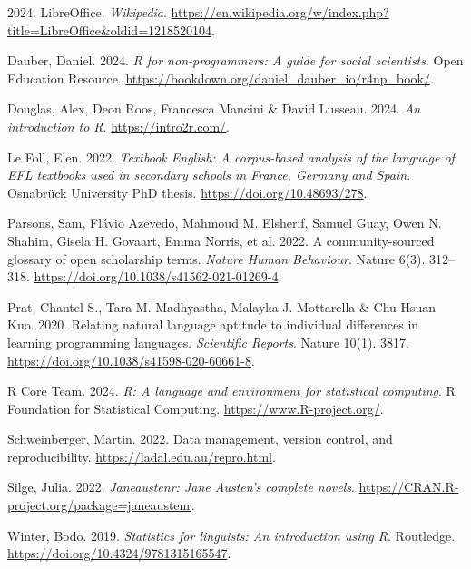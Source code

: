 \documentclass[
  letterpaper,
  DIV=11,
  numbers=noendperiod]{scrreprt}
\newlength{\cslhangindent}
\newenvironment{CSLReferences}[2] %
 {\begin{list}{}{%
  \setlength{\itemindent}{0pt}
  \setlength{\leftmargin}{0pt}
  \setlength{\parsep}{0pt}
  \ifodd #1
   \setlength{\leftmargin}{\cslhangindent}
   \setlength{\itemindent}{-1\cslhangindent}
  \fi
  \setlength{\itemsep}{#2\baselineskip}}}
 {\end{list}}
\begin{document}
\label{refs}
\begin{CSLReferences}{1}{0}
2024. LibreOffice. \emph{Wikipedia}.
\url{https://en.wikipedia.org/w/index.php?title=LibreOffice&oldid=1218520104}.

Dauber, Daniel. 2024. \emph{R for non-programmers: A guide for social
scientists}. Open Education Resource.
\url{https://bookdown.org/daniel_dauber_io/r4np_book/}.

Douglas, Alex, Deon Roos, Francesca Mancini \& David Lusseau. 2024.
\emph{An introduction to {R}}. \url{https://intro2r.com/}.

Le Foll, Elen. 2022. \emph{{Textbook} {English}: A corpus-based analysis
of the language of EFL textbooks used in secondary schools in {France},
{Germany} and {Spain}}. Osnabrück University PhD thesis.
\url{https://doi.org/10.48693/278}.

Parsons, Sam, Flávio Azevedo, Mahmoud M. Elsherif, Samuel Guay, Owen N.
Shahim, Gisela H. Govaart, Emma Norris, et al. 2022. A community-sourced
glossary of {open} {scholarship} terms. \emph{Nature Human Behaviour}.
Nature 6(3). 312--318. \url{https://doi.org/10.1038/s41562-021-01269-4}.

Prat, Chantel S., Tara M. Madhyastha, Malayka J. Mottarella \& Chu-Hsuan
Kuo. 2020. Relating natural language aptitude to individual differences
in learning programming languages. \emph{Scientific Reports}. Nature
10(1). 3817. \url{https://doi.org/10.1038/s41598-020-60661-8}.

R Core Team. 2024. \emph{R: A language and environment for statistical
computing}. R Foundation for Statistical Computing.
\url{https://www.R-project.org/}.

Schweinberger, Martin. 2022. Data management, version control, and
reproducibility. \url{https://ladal.edu.au/repro.html}.

Silge, Julia. 2022. \emph{Janeaustenr: Jane {Austen}'s complete novels}.
\url{https://CRAN.R-project.org/package=janeaustenr}.

Winter, Bodo. 2019. \emph{Statistics for linguists: An introduction
using {R}}. Routledge. \url{https://doi.org/10.4324/9781315165547}.

\end{CSLReferences}
\end{document}
